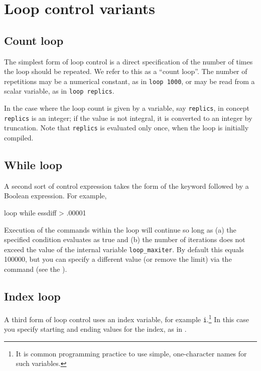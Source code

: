 \section{Loop control variants}
\label{loop-control}

\subsection{Count loop}
\label{loop-count}

The simplest form of loop control is a direct specification of the
number of times the loop should be repeated.  We refer to this as a
``count loop''.  The number of repetitions may be a numerical
constant, as in \verb+loop 1000+, or may be read from a scalar
variable, as in \verb+loop replics+.

In the case where the loop count is given by a variable, say
\verb+replics+, in concept \verb+replics+ is an integer; if the value
is not integral, it is converted to an integer by truncation.  Note
that \verb+replics+ is evaluated only once, when the loop is initially
compiled.
      

\subsection{While loop}
\label{loop-while}

A second sort of control expression takes the form of the keyword
 followed by a Boolean expression.  For example,
%
\begin{code}
loop while essdiff > .00001
\end{code}

Execution of the commands within the loop will continue so long as (a)
the specified condition evaluates as true and (b) the number of
iterations does not exceed the value of the internal variable
\verb|loop_maxiter|.  By default this equals 100000, but you can specify
a different value (or remove the limit) via the  command (see 
the \GCR).

\subsection{Index loop}
\label{loop-index}

A third form of loop control uses an index variable, for example
\verb+i+.\footnote{It is common programming practice to use simple,
  one-character names for such variables.}  In this case you specify
starting and ending values for the index, as in .

